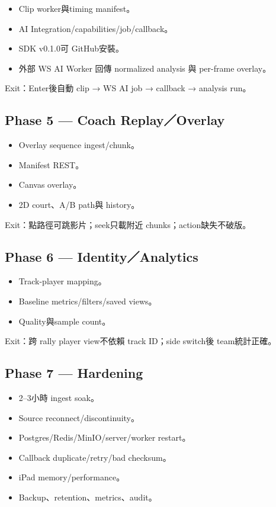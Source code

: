\documentclass[
  9pt,
  a4paper,
]{article}
\providecommand{\tightlist}{%
  \setlength{\itemsep}{0pt}\setlength{\parskip}{0pt}}
\begin{document}
\begin{itemize}
\tightlist
\item
  Clip worker與timing manifest。
\item
  AI Integration/capabilities/job/callback。
\item
  SDK v0.1.0可 GitHub安裝。
\item
  外部 WS AI Worker 回傳 normalized analysis 與 per-frame overlay。
\end{itemize}

Exit：Enter後自動 clip → WS AI job → callback → analysis run。

\subsection{Phase 5 --- Coach
Replay／Overlay}\label{phase-5--coach-replayoverlay}

\begin{itemize}
\tightlist
\item
  Overlay sequence ingest/chunk。
\item
  Manifest REST。
\item
  Canvas overlay。
\item
  2D court、A/B path與 history。
\end{itemize}

Exit：點路徑可跳影片；seek只載附近 chunks；action缺失不破版。

\subsection{Phase 6 ---
Identity／Analytics}\label{phase-6--identityanalytics}

\begin{itemize}
\tightlist
\item
  Track-player mapping。
\item
  Baseline metrics/filters/saved views。
\item
  Quality與sample count。
\end{itemize}

Exit：跨 rally player view不依賴 track ID；side switch後 team統計正確。

\subsection{Phase 7 --- Hardening}\label{phase-7--hardening}

\begin{itemize}
\tightlist
\item
  2--3小時 ingest soak。
\item
  Source reconnect/discontinuity。
\item
  Postgres/Redis/MinIO/server/worker restart。
\item
  Callback duplicate/retry/bad checksum。
\item
  iPad memory/performance。
\item
  Backup、retention、metrics、audit。
\end{itemize}
\end{document}
